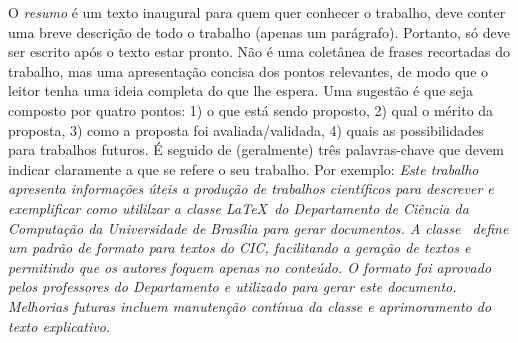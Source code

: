 

O \emph{resumo} é um texto inaugural para quem quer conhecer o trabalho, deve conter
uma breve descrição de todo o trabalho (apenas um parágrafo). Portanto, só deve
ser escrito após o texto estar pronto. Não é uma coletânea de frases recortadas
do trabalho, mas uma apresentação concisa dos pontos relevantes, de modo que o
leitor tenha uma ideia completa do que lhe espera. Uma sugestão é que seja composto
por quatro pontos: 1) o que está sendo proposto, 2) qual o mérito da proposta, 3)
como a proposta foi avaliada/validada, 4) quais as possibilidades para trabalhos
futuros. É seguido de (geralmente) três palavras-chave que devem indicar claramente a que se
refere o seu trabalho. Por exemplo: \emph{Este trabalho apresenta informações úteis a produção de trabalhos
científicos para descrever e exemplificar como utililzar a classe \LaTeX\ do
Departamento de Ciência da Computação da Universidade de Brasília para gerar
documentos. A classe \unbcic\ define um padrão de formato para textos do CIC, facilitando a
geração de textos e permitindo que os autores foquem apenas no conteúdo. O formato
foi aprovado pelos professores do Departamento e utilizado para gerar este documento.
Melhorias futuras incluem manutenção contínua da classe e aprimoramento do texto
explicativo.}